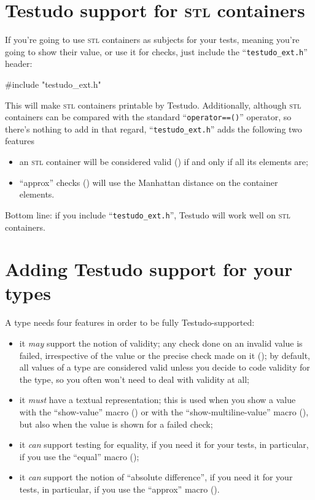 \documentclass[twoside, a4paper, article]{memoir}
\begin{document}
\chapter{Testudo support for \textsc{stl} containers}
\label{cha:testudo-support-stl-types}

If you're going to use \textsc{stl} containers as subjects for your tests,
meaning you're going to show their value, or use it for checks, just include
the ``\texttt{testudo\_ext.h}'' header:
\begin{cpplisting}
#include "testudo_ext.h"
\end{cpplisting}

This will make \textsc{stl} containers printable by Testudo.  Additionally,
although \textsc{stl} containers can be compared with the standard
``\texttt{operator==()}'' operator, so there's nothing to add in that regard,
``\texttt{testudo\_ext.h}'' adds the following two features
\begin{itemize}
\item an \textsc{stl} container will be considered valid
  () if and only if all its elements are;
\item ``approx'' checks () will use
  the Manhattan distance on the container elements.
\end{itemize}

Bottom line: if you include ``\texttt{testudo\_ext.h}'', Testudo will work well
on \textsc{stl} containers.


\chapter{Adding Testudo support for your types}
\label{cha:adding-testudo-support-your-types}

A type needs four features in order to be fully Testudo-supported:
\begin{itemize}
\item it \emph{may} support the notion of validity; any check done on an
  invalid value is failed, irrespective of the value or the precise check made
  on it (); by default, all values of a type are
  considered valid unless you decide to code validity for the type, so you
  often won't need to deal with validity at all;
\item it \emph{must} have a textual representation; this is used when you show
  a value with the ``show-value'' macro () or with
  the ``show-multiline-value'' macro (), but
  also when the value is shown for a failed check;
\item it \emph{can} support testing for equality, if you need it for your
  tests, in particular, if you use the ``equal'' macro
  ();
\item it \emph{can} support the notion of ``absolute difference'', if you need
  it for your tests, in particular, if you use the ``approx'' macro
  ().
\end{itemize}
\end{document}
